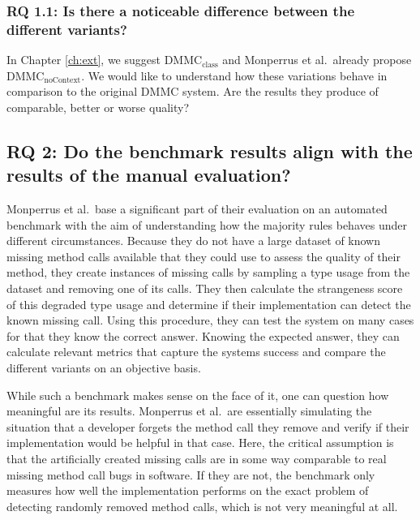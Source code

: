 \subsubsection{RQ 1.1: Is there a noticeable difference between the different variants?}

In Chapter \ref{ch:ext}, we suggest $\text{DMMC}_\text{class}$ and Monperrus et al.\ already propose $\text{DMMC}_\text{noContext}$.
We would like to understand how these variations behave in comparison to the original $\text{DMMC}$ system.
Are the results they produce of comparable, better or worse quality?

\subsection*{RQ 2: Do the benchmark results align with the results of the manual evaluation?}

Monperrus et al.\ base a significant part of their evaluation on an automated benchmark with the aim of understanding how the majority rules behaves under different circumstances.
Because they do not have a large dataset of known missing method calls available that they could use to assess the quality of their method, they create instances of missing calls by sampling a type usage from the dataset and removing one of its calls.
They then calculate the strangeness score of this degraded type usage and determine if their implementation can detect the known missing call.
Using this procedure, they can test the system on many cases for that they know the correct answer.
Knowing the expected answer, they can calculate relevant metrics that capture the systems success and compare the different variants on an objective basis.

While such a benchmark makes sense on the face of it, one can question how meaningful are its results.
Monperrus et al.\ are essentially simulating the situation that a developer forgets the method call they remove and verify if their implementation would be helpful in that case.
Here, the critical assumption is that the artificially created missing calls are in some way comparable to real missing method call bugs in software.
If they are not, the benchmark only measures how well the implementation performs on the exact problem of detecting randomly removed method calls, which is not very meaningful at all.

